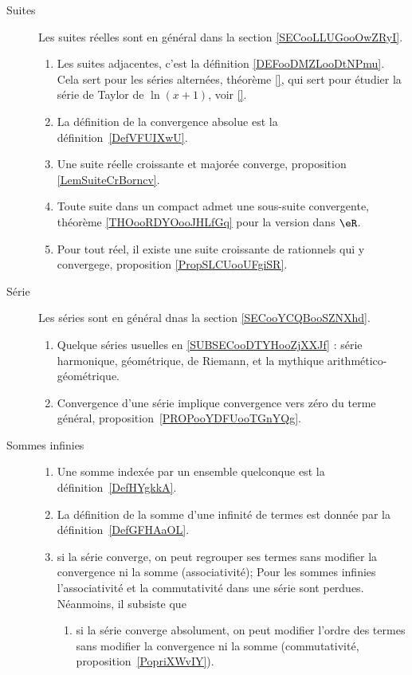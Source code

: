 

\begin{description}
    \item[Suites] 
        Les suites réelles sont en général dans la section \ref{SECooLLUGooOwZRyI}.
        \begin{enumerate}
    \item
        Les suites adjacentes, c'est la définition \ref{DEFooDMZLooDtNPmu}. Cela sert pour les séries alternées, théorème \ref{}, qui sert pour étudier la série de Taylor de \( \ln(x+1)\), voir \ref{}.
    \item
        La définition de la convergence absolue est la définition~\ref{DefVFUIXwU}.
            \item
                Une suite réelle croissante et majorée converge, proposition \ref{LemSuiteCrBorncv}.
            \item
                Toute suite dans un compact admet une sous-suite convergente, théorème \ref{THOooRDYOooJHLfGq} pour la version dans \( \eR\).
            \item
                Pour tout réel, il existe une suite croissante de rationnels qui y convergege, proposition \ref{PropSLCUooUFgiSR}.
        \end{enumerate}
    \item[Série] 
        Les séries sont en général dnas la section \ref{SECooYCQBooSZNXhd}.
        \begin{enumerate}
    \item
        Quelque séries usuelles en \ref{SUBSECooDTYHooZjXXJf} : série harmonique, géométrique, de Riemann, et la mythique arithmético-géométrique.
                
    \item
        Convergence d'une série implique convergence vers zéro du terme général, proposition~\ref{PROPooYDFUooTGnYQg}.
        \end{enumerate}
    \item[Sommes infinies]
        \begin{enumerate}
            \item
Une somme indexée par un ensemble quelconque est la définition~\ref{DefHYgkkA}.
    \item
        La définition de la somme d'une infinité de termes est donnée par la définition~\ref{DefGFHAaOL}.
  \item
      si la série converge, on peut regrouper ses termes sans modifier la convergence ni la somme (associativité);
    Pour les sommes infinies l'associativité et la commutativité dans une série sont perdues. Néanmoins, il subsiste que
  \begin{enumerate}
  \item
      si la série converge absolument, on peut modifier l'ordre des termes sans modifier la convergence ni la somme (commutativité, proposition~\ref{PopriXWvIY}).
  \end{enumerate}
        \end{enumerate}
\end{description}

